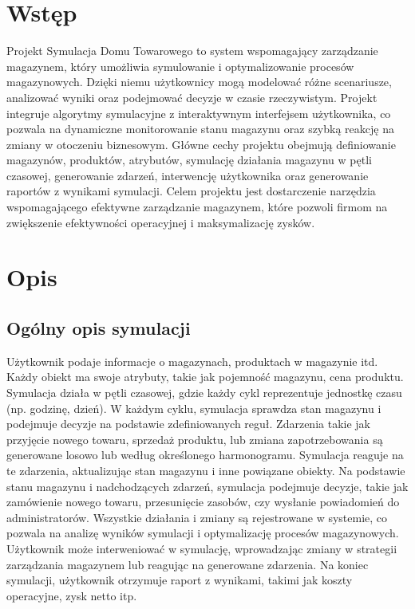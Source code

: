 \documentclass[11pt]{article}
\begin{document}
\newpage




\section{Wstęp}

Projekt Symulacja Domu Towarowego to system wspomagający zarządzanie magazynem, który umożliwia symulowanie i optymalizowanie procesów magazynowych. Dzięki niemu użytkownicy mogą modelować różne scenariusze, analizować wyniki oraz podejmować decyzje w czasie rzeczywistym. Projekt integruje algorytmy symulacyjne z interaktywnym interfejsem użytkownika, co pozwala na dynamiczne monitorowanie stanu magazynu oraz szybką reakcję na zmiany w otoczeniu biznesowym. Główne cechy projektu obejmują definiowanie magazynów, produktów, atrybutów, symulację działania magazynu w pętli czasowej, generowanie zdarzeń, interwencję użytkownika oraz generowanie raportów z wynikami symulacji. Celem projektu jest dostarczenie narzędzia wspomagającego efektywne zarządzanie magazynem, które pozwoli firmom na zwiększenie efektywności operacyjnej i maksymalizację zysków.

\section{Opis}

\subsection{Ogólny opis symulacji}
Użytkownik podaje informacje o magazynach, produktach w magazynie itd. Każdy obiekt ma swoje atrybuty, takie jak pojemność magazynu, cena produktu. Symulacja działa w pętli czasowej, gdzie każdy cykl reprezentuje jednostkę czasu (np. godzinę, dzień). W każdym cyklu, symulacja sprawdza stan magazynu i podejmuje decyzje na podstawie zdefiniowanych reguł. Zdarzenia takie jak przyjęcie nowego towaru, sprzedaż produktu, lub zmiana zapotrzebowania są generowane losowo lub według określonego harmonogramu. Symulacja reaguje na te zdarzenia, aktualizując stan magazynu i inne powiązane obiekty. Na podstawie stanu magazynu i nadchodzących zdarzeń, symulacja podejmuje decyzje, takie jak zamówienie nowego towaru, przesunięcie zasobów, czy wysłanie powiadomień do administratorów. Wszystkie działania i zmiany są rejestrowane w systemie, co pozwala na analizę wyników symulacji i optymalizację procesów magazynowych. Użytkownik może interweniować w symulację, wprowadzając zmiany w strategii zarządzania magazynem lub reagując na generowane zdarzenia.
Na koniec symulacji, użytkownik otrzymuje raport z wynikami, takimi jak koszty operacyjne, zysk netto itp.
\end{document}
